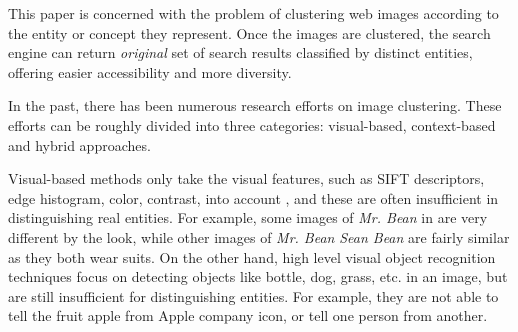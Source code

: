 
This paper is concerned with the problem of clustering web images
according to the entity or concept they represent.
Once the images are clustered, the search engine can
return {\em original} set of search results classified by distinct entities,
offering easier accessibility and more diversity.

In the past, there has been numerous research efforts on image clustering. These
efforts can be roughly divided into three categories: visual-based,
context-based and hybrid approaches.

Visual-based methods
only take the visual features, such as SIFT descriptors,
edge histogram, color, contrast, into account \cite{Fu2011, ZhongLL11},
and these are often insufficient in distinguishing real entities.
For example, some images of {\em Mr. Bean}
in  are very different by the look,
while other images of {\em Mr. Bean} {\em Sean Bean} are fairly
similar as they both wear suits.
On the other hand, high level visual object recognition
techniques\cite{Li09scene, Krizhevsky12} focus on detecting objects like
bottle, dog, grass, etc. in an image, but are still insufficient for
distinguishing entities. For example,
they are not able to tell the fruit apple from Apple company icon,
or tell one person from another.

